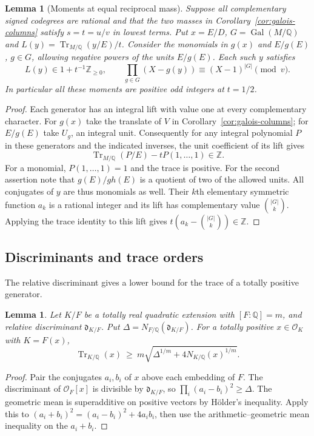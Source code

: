 \documentclass[11pt,reqno]{amsart}
\newtheorem{lemma}[theorem]{Lemma}
\theoremstyle{remark}\newtheorem{remark}[theorem]{Remark}
\numberwithin{equation}{section}
\begin{document}
\begin{lemma}[Moments at equal reciprocal mass]\label{lem:mass-moments}
Suppose all complementary signed codegrees are rational and that the
two masses in Corollary~\ref{cor:galois-columns} satisfy
$s=t=u/v$ in lowest terms. Put $x=E/D$, $G=\operatorname{Gal}(M/\mathbb Q)$
and $L(y)=\operatorname{Tr}_{M/\mathbb Q}(y/E)/t$. Consider the monomials
in $g(x)$ and $E/g(E)$, $g\in G$, allowing negative powers of the
units $E/g(E)$. Each such $y$ satisfies
\[
 L(y)\in 1+t^{-1}\mathbb Z_{\ge0},\qquad
 \prod_{g\in G}(X-g(y))\equiv (X-1)^{|G|}\pmod v .
\]
In particular all these moments are positive odd integers at $t=1/2$.
\end{lemma}
\begin{proof}
Each generator has an integral lift with value one at every
complementary character. For $g(x)$ take the translate of $V$ in
Corollary~\ref{cor:galois-columns}; for $E/g(E)$ take $U_g$, an integral
unit. Consequently for any integral polynomial $P$ in these generators
and the indicated inverses, the unit coefficient of its lift gives
\[
  \operatorname{Tr}_{M/\mathbb Q}(P/E)-tP(1,\ldots,1)\in\mathbb Z .
\]
For a monomial, $P(1,\ldots,1)=1$ and the trace is positive. For the
second assertion note that $g(E)/gh(E)$ is a quotient of two of the
allowed units. All conjugates of $y$ are thus monomials as well.
Their $k$th elementary symmetric function $a_k$ is a rational integer
and its lift has complementary value $\binom{|G|}{k}$. Applying the
trace identity to this lift gives $t(a_k-\binom{|G|}{k})\in\mathbb Z$.
\end{proof}

\subsection{Discriminants and trace orders}
The relative discriminant gives a lower bound for the trace of a
totally positive generator.

\begin{lemma}\label{lem:relative-trace-discriminant}
Let $K/F$ be a totally real quadratic extension with $[F:\mathbb Q]=m$,
and relative discriminant $\mathfrak d_{K/F}$. Put $\Delta=N_{F/\mathbb Q}(\mathfrak d_{K/F})$. For a totally
positive $x\in\mathcal O_K$ with $K=F(x)$,
\[
 \operatorname{Tr}_{K/\mathbb Q}(x)\ \ge\
   m\sqrt{\Delta^{1/m}+4N_{K/\mathbb Q}(x)^{1/m}} .
\]
\end{lemma}
\begin{proof}
Pair the conjugates $a_i,b_i$ of $x$ above each embedding of $F$.
The discriminant of $\mathcal O_F[x]$ is divisible by
$\mathfrak d_{K/F}$, so $\prod_i(a_i-b_i)^2\ge\Delta$.
The geometric mean is superadditive on positive vectors by H\"older's
inequality. Apply this to $(a_i+b_i)^2=(a_i-b_i)^2+4a_i b_i$, then
use the arithmetic--geometric mean inequality on the $a_i+b_i$.
\end{proof}
\end{document}
